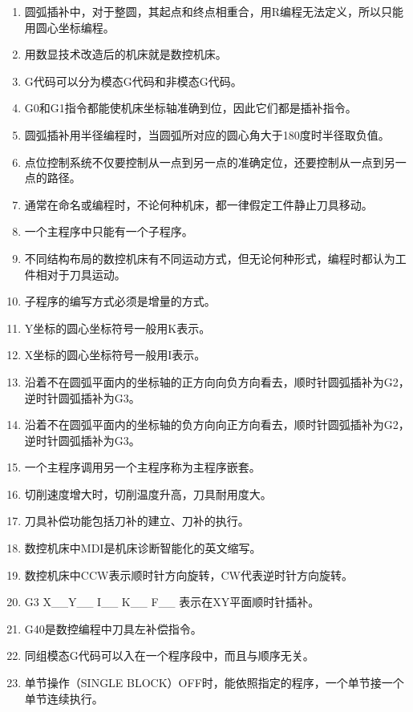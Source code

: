 \documentclass[12pt,twocolumn,landscape,UTF8,twoside,fontset=windows]{ctexart}%
\begin{document}
\begin{enumerate} [1、]
	\item 圆弧插补中，对于整圆，其起点和终点相重合，用R编程无法定义，所以只能用圆心坐标编程。
	\item 用数显技术改造后的机床就是数控机床。
	\item G代码可以分为模态G代码和非模态G代码。
	\item G0和G1指令都能使机床坐标轴准确到位，因此它们都是插补指令。
	\item 圆弧插补用半径编程时，当圆弧所对应的圆心角大于180度时半径取负值。
	\item 点位控制系统不仅要控制从一点到另一点的准确定位，还要控制从一点到另一点的路径。
	\item 通常在命名或编程时，不论何种机床，都一律假定工件静止刀具移动。
	\item 一个主程序中只能有一个子程序。
	\item 不同结构布局的数控机床有不同运动方式，但无论何种形式，编程时都认为工件相对于刀具运动。
	\item 子程序的编写方式必须是增量的方式。
	\item Y坐标的圆心坐标符号一般用K表示。
	\item X坐标的圆心坐标符号一般用I表示。
	\item 沿着不在圆弧平面内的坐标轴的正方向向负方向看去，顺时针圆弧插补为G2，逆时针圆弧插补为G3。
	\item 沿着不在圆弧平面内的坐标轴的负方向向正方向看去，顺时针圆弧插补为G2，逆时针圆弧插补为G3。
	\item 一个主程序调用另一个主程序称为主程序嵌套。
	\item 切削速度增大时，切削温度升高，刀具耐用度大。
	\item 刀具补偿功能包括刀补的建立、刀补的执行。
	\item 数控机床中MDI是机床诊断智能化的英文缩写。
	\item 数控机床中CCW表示顺时针方向旋转，CW代表逆时针方向旋转。
	\item G3 X\_\_Y\_\_ I\_\_ K\_\_ F\_\_ 表示在XY平面顺时针插补。
	\item G40是数控编程中刀具左补偿指令。
	\item 同组模态G代码可以入在一个程序段中，而且与顺序无关。
	\item 单节操作（SINGLE BLOCK）OFF时，能依照指定的程序，一个单节接一个单节连续执行。

\end{enumerate}
\end{document}
